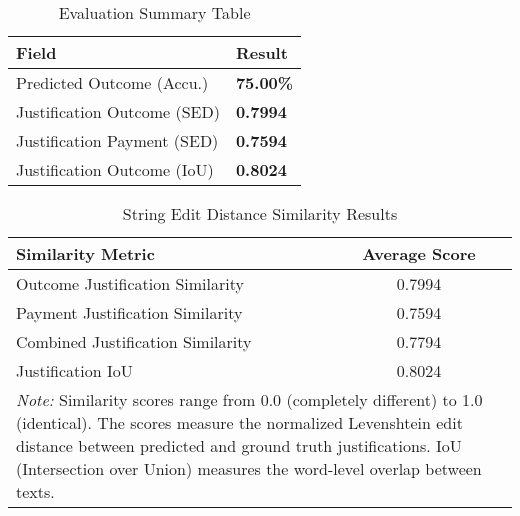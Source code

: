 
\begin{table}[H]
\centering
\caption{Evaluation Summary Table}
\label{tab:evaluation_summary}
\begin{tabular}{@{}lp{2cm}@{}}
\toprule
\textbf{Field} & \textbf{Result} \\
\midrule
Predicted Outcome (Accu.) & \textbf{75.00\%} \\
Justification Outcome (SED) &  \textbf{0.7994} \\
Justification Payment (SED) &  \textbf{0.7594} \\
Justification Outcome (IoU) &  \textbf{0.8024} \\
\bottomrule
\end{tabular}
\end{table}

\begin{table}[!ht]
\centering
\caption{String Edit Distance Similarity Results}
\label{tab:string_edit_distance_results}
\begin{tabular}{lc}
\toprule
\textbf{Similarity Metric} & \textbf{Average Score} \\
\midrule
Outcome Justification Similarity & 0.7994 \\
Payment Justification Similarity & 0.7594 \\
Combined Justification Similarity & 0.7794 \\
Justification IoU & 0.8024 \\
\midrule
\multicolumn{2}{p{13cm}}{\textit{Note:} Similarity scores range from 0.0 (completely different) to 1.0 (identical). 
The scores measure the normalized Levenshtein edit distance between predicted and ground truth justifications.
IoU (Intersection over Union) measures the word-level overlap between texts.} \\
\bottomrule
\end{tabular}
\end{table}

